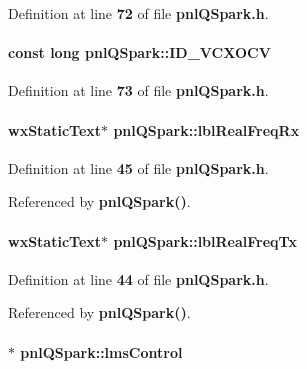 Definition at line {\bf 72} of file {\bf pnl\+Q\+Spark.\+h}.

\paragraph[{I\+D\+\_\+\+V\+C\+X\+O\+CV}]{\setlength{\rightskip}{0pt plus 5cm}const long pnl\+Q\+Spark\+::\+I\+D\+\_\+\+V\+C\+X\+O\+CV\hspace{0.3cm}{\ttfamily [static]}}\label{classpnlQSpark_a2fe92ad10d150b315f2db63db2bd57cb}


Definition at line {\bf 73} of file {\bf pnl\+Q\+Spark.\+h}.

\paragraph[{lbl\+Real\+Freq\+Rx}]{\setlength{\rightskip}{0pt plus 5cm}wx\+Static\+Text$\ast$ pnl\+Q\+Spark\+::lbl\+Real\+Freq\+Rx}\label{classpnlQSpark_a5833d4fd9491bc2aa8eefe80b6f8d4be}


Definition at line {\bf 45} of file {\bf pnl\+Q\+Spark.\+h}.



Referenced by {\bf pnl\+Q\+Spark()}.

\paragraph[{lbl\+Real\+Freq\+Tx}]{\setlength{\rightskip}{0pt plus 5cm}wx\+Static\+Text$\ast$ pnl\+Q\+Spark\+::lbl\+Real\+Freq\+Tx}\label{classpnlQSpark_a8b11eaf7da67c92aa17c089a1bffe107}


Definition at line {\bf 44} of file {\bf pnl\+Q\+Spark.\+h}.



Referenced by {\bf pnl\+Q\+Spark()}.

\paragraph[{lms\+Control}]{$\ast$ pnl\+Q\+Spark\+::lms\+Control\hspace{0.3cm}{\ttfamily [protected]}}\label{classpnlQSpark_a096206331f4ca26e2f961b302ad0d770}


